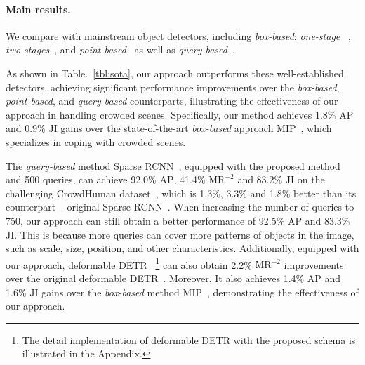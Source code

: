 \documentclass[final]{cvpr}
\begin{document}
\vspace{-1pc}
\paragraph{Main results.} We compare with mainstream object detectors, including \textit{box-based}: \textit{one-stage}~\cite{lin2020focal, 2020atss} , \textit{two-stages}~\cite{chu2020detection,lin2017feature,huang2020nms,liu2019adaptive}, and \textit{point-based}~\cite{tian2021fcos, wang2020end} as well as \textit{query-based}~\cite{carion2020end,zhu2021deformable, sun2020sparse,lin2020detr}. 

As shown in Table.~\ref{tbl:sota}, our approach outperforms these well-established detectors, achieving significant performance improvements over the \textit{box-based}, \textit{point-based}, and \textit{query-based} counterparts, illustrating the effectiveness of our approach in handling crowded scenes. Specifically, our method achieves 1.8\% $\text{AP}$ and 0.9\% $\text{JI}$ gains over the state-of-the-art \textit{box-based} approach MIP~\cite{chu2020detection}, which specializes in coping with crowded scenes.

The \textit{query-based} method Sparse RCNN~\cite{sun2020sparse}, equipped with the proposed method and 500 queries, can achieve 92.0\% $\text{AP}$, 41.4\% $\text{MR}^{-2}$ and 83.2\% $\text{JI}$ on the challenging CrowdHuman dataset~\cite{shao2018crowdhuman}, which is 1.3\%, 3.3\% and 1.8\% better than its counterpart -- original Sparse RCNN~\cite{sun2020sparse}. When increasing the number of queries to 750, our approach can still obtain a better performance of 92.5\% $\text{AP}$ and 83.3\% $\text{JI}$. This is because more queries can cover more patterns of objects in the image, such as scale, size, position, and other characteristics. Additionally, equipped with our approach, deformable DETR ~\cite{zhu2021deformable}\footnote{The detail implementation of deformable DETR with the proposed schema is illustrated in the Appendix.} can also obtain 2.2\% $\text{MR}^{-2}$ improvements over the original deformable DETR~\cite{zhu2021deformable}. Moreover, It also achieves 1.4\% $\text{AP}$ and 1.6\% $\text{JI}$ gains over the \textit{box-based} method MIP~\cite{chu2020detection}, demonstrating the effectiveness of our approach.
 
\end{document}

